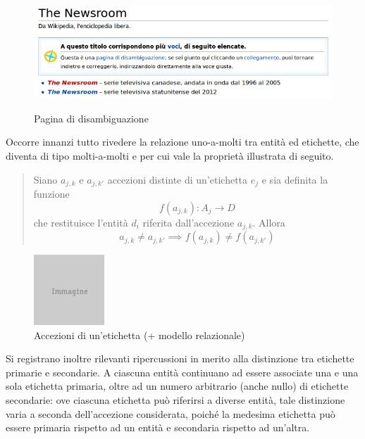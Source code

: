 \begin{figure}[ht]
	\begin{center}
		\includegraphics[width=12cm]{disambigua.png}
		\label{fig:tesi:stage:classificazione:disambiguazione}
		\caption{Pagina di disambiguazione \cite{wiki:disambigua}}
	\end{center}
\end{figure}

Occorre innanzi tutto rivedere la relazione uno-a-molti tra entità ed etichette, che diventa di tipo molti-a-molti e per cui vale la proprietà illustrata di seguito.

\begin{quotation}
Siano $a_{j,k}$ e $a_{j,k'}$ accezioni distinte di un'etichetta $e_j$ e sia definita la funzione
\begin{equation}
f(a_{j,k}): A_j \rightarrow D
\end{equation}
che restituisce l'entità $d_i$ riferita dall'accezione $a_{j,k}$. Allora
\begin{equation}
a_{j,k} \neq a_{j,k'} \implies f(a_{j,k}) \neq f(a_{j,k'})
\end{equation}
\end{quotation}

\begin{figure}[ht]
	\begin{center}
		\includegraphics{placeholder.png}
		\caption{Accezioni di un'etichetta (+ modello relazionale)}
		\label{fig:tesi:stage:fase-uno:etichette-accezioni}
	\end{center}
\end{figure}

Si registrano inoltre rilevanti ripercussioni in merito alla distinzione tra etichette primarie e secondarie. A ciascuna entità continuano ad essere associate una e una sola etichetta primaria, oltre ad un numero arbitrario (anche nullo) di etichette secondarie: ove ciascuna etichetta può riferirsi a diverse entità, tale distinzione varia a seconda dell'accezione considerata, poiché la medesima etichetta può essere primaria rispetto ad un entità e secondaria rispetto ad un'altra.

